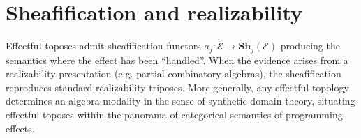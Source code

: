 \documentclass[12pt]{article}
\newcommand{\Sh}{\mathbf{Sh}}
\newcommand{\E}{\mathcal{E}}
\begin{document}
\section*{Sheafification and realizability}
Effectful toposes admit sheafification functors $a_j\colon\E\to\Sh_j(\E)$ producing the semantics where the effect has been ``handled''.  When the evidence arises from a realizability presentation (e.g. partial combinatory algebras), the sheafification reproduces standard realizability triposes.  More generally, any effectful topology determines an algebra modality in the sense of synthetic domain theory, situating effectful toposes within the panorama of categorical semantics of programming effects.
\end{document}
